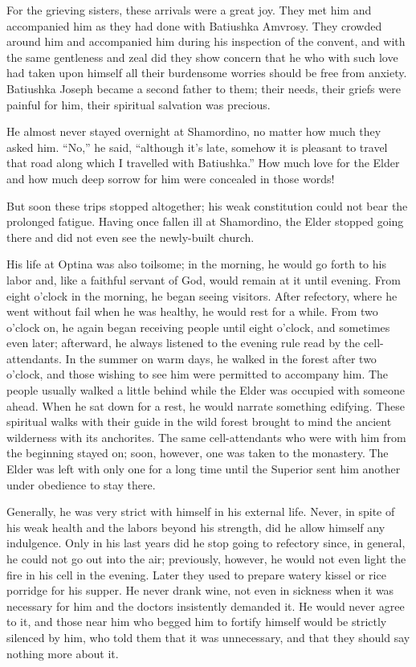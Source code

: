 For the grieving sisters, these arrivals were a great joy. They met him and accompanied him as they had done with Batiushka Amvrosy. They crowded around him and accompanied him during his inspection of the convent, and with the same gentleness and zeal did they show concern that he who with such love had taken upon himself all their burdensome worries should be free from anxiety. Batiushka Joseph became a second father to them; their needs, their griefs were painful for him, their spiritual salvation was precious.

He almost never stayed overnight at Shamordino, no matter how much they asked him. “No,” he said, “although it's late, somehow it is pleasant to travel that road along which I travelled with Batiushka.” How much love for the Elder and how much deep sorrow for him were concealed in those words!

But soon these trips stopped altogether; his weak constitution could not bear the prolonged fatigue. Having once fallen ill at Shamordino, the Elder stopped going there and did not even see the newly-built church.

His life at Optina was also toilsome; in the morning, he would go forth to his labor and, like a faithful servant of God, would remain at it until evening. From eight o'clock in the morning, he began seeing visitors. After refectory, where he went without fail when he was healthy, he would rest for a while. From two o'clock on, he again began receiving people until eight o'clock, and sometimes even later; afterward, he always listened to the evening rule read by the cell-attendants. In the summer on warm days, he walked in the forest after two o'clock, and those wishing to see him were permitted to accompany him. The people usually walked a little behind while the Elder was occupied with someone ahead. When he sat down for a rest, he would narrate something edifying. These spiritual walks with their guide in the wild forest brought to mind the ancient wilderness with its anchorites. The same cell-attendants who were with him from the beginning stayed on; soon, however, one was taken to the monastery. The Elder was left with only one for a long time until the Superior sent him another under obedience to stay there.

Generally, he was very strict with himself in his external life. Never, in spite of his weak health and the labors beyond his strength, did he allow himself any indulgence. Only in his last years did he stop going to refectory since, in general, he could not go out into the air; previously, however, he would not even light the fire in his cell in the evening. Later they used to prepare watery kissel or rice porridge for his supper. He never drank wine, not even in sickness when it was necessary for him and the doctors insistently demanded it. He would never agree to it, and those near him who begged him to fortify himself would be strictly silenced by him, who told them that it was unnecessary, and that they should say nothing more about it.

